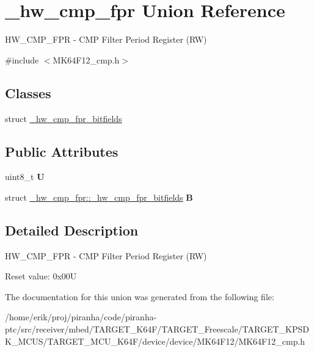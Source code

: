 \hypertarget{union__hw__cmp__fpr}{}\section{\+\_\+hw\+\_\+cmp\+\_\+fpr Union Reference}
\label{union__hw__cmp__fpr}


H\+W\+\_\+\+C\+M\+P\+\_\+\+F\+PR -\/ C\+MP Filter Period Register (RW)  




{\ttfamily \#include $<$M\+K64\+F12\+\_\+cmp.\+h$>$}

\subsection*{Classes}
\begin{DoxyCompactItemize}
\item 
struct \hyperlink{struct__hw__cmp__fpr_1_1__hw__cmp__fpr__bitfields}{\+\_\+hw\+\_\+cmp\+\_\+fpr\+\_\+bitfields}
\end{DoxyCompactItemize}
\subsection*{Public Attributes}
\begin{DoxyCompactItemize}
\item 
uint8\+\_\+t {\bfseries U}\hypertarget{union__hw__cmp__fpr_a1d4d3bb3aa65c4c51cd09bc53f3e0420}{}\label{union__hw__cmp__fpr_a1d4d3bb3aa65c4c51cd09bc53f3e0420}

\item 
struct \hyperlink{struct__hw__cmp__fpr_1_1__hw__cmp__fpr__bitfields}{\+\_\+hw\+\_\+cmp\+\_\+fpr\+::\+\_\+hw\+\_\+cmp\+\_\+fpr\+\_\+bitfields} {\bfseries B}\hypertarget{union__hw__cmp__fpr_a62862c9d308d3508ab82da55d18839db}{}\label{union__hw__cmp__fpr_a62862c9d308d3508ab82da55d18839db}

\end{DoxyCompactItemize}


\subsection{Detailed Description}
H\+W\+\_\+\+C\+M\+P\+\_\+\+F\+PR -\/ C\+MP Filter Period Register (RW) 

Reset value\+: 0x00U 

The documentation for this union was generated from the following file\+:\begin{DoxyCompactItemize}
\item 
/home/erik/proj/piranha/code/piranha-\/ptc/src/receiver/mbed/\+T\+A\+R\+G\+E\+T\+\_\+\+K64\+F/\+T\+A\+R\+G\+E\+T\+\_\+\+Freescale/\+T\+A\+R\+G\+E\+T\+\_\+\+K\+P\+S\+D\+K\+\_\+\+M\+C\+U\+S/\+T\+A\+R\+G\+E\+T\+\_\+\+M\+C\+U\+\_\+\+K64\+F/device/device/\+M\+K64\+F12/M\+K64\+F12\+\_\+cmp.\+h\end{DoxyCompactItemize}
